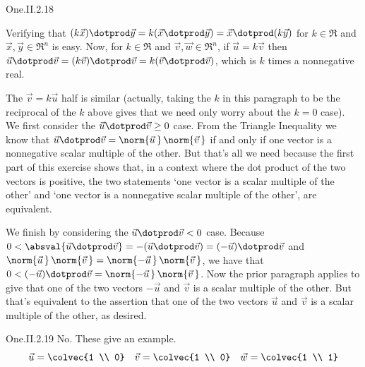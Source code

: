 \begin{ans}{One.II.2.18}
       \begin{exparts}
         \partsitem Verifying that
           \( (k\vec{x})\dotprod\vec{y}=k(\vec{x}\dotprod\vec{y})
           =\vec{x}\dotprod(k\vec{y}) \) for \( k\in\Re \) and
           \( \vec{x},\vec{y}\in\Re^n \) is easy.
           Now, for \( k\in\Re \) and \( \vec{v},\vec{w}\in\Re^n \),
           if \( \vec{u}=k\vec{v} \) then
           \( \vec{u}\dotprod\vec{v}=(k\vec{v})\dotprod\vec{v}
             =k(\vec{v}\dotprod\vec{v}) \),
           which is \( k \) times a nonnegative
           real.

           The \( \vec{v}=k\vec{u} \) half is similar (actually, taking the
           \( k \) in this paragraph to be the reciprocal of the \( k \)
           above gives that we need only worry about the \( k=0 \) case).
         \partsitem We first consider the $\vec{u}\dotprod\vec{v}\geq 0$ case.
           From the Triangle Inequality we know that
           \( \vec{u}\dotprod\vec{v}=\norm{\vec{u}\,}\,\norm{\vec{v}\,} \)
           if and only if one vector is a nonnegative scalar multiple of the
           other.
           But that's all we need because the
           first part of this exercise shows that,
           in a context where the dot product of the two vectors is positive,
           the two statements
           `one vector is a
           scalar multiple of the other' and `one vector is a nonnegative
           scalar multiple of the other', are equivalent.

           We finish by considering the $\vec{u}\dotprod\vec{v}< 0$ case.
           Because
           $0<\absval{\vec{u}\dotprod\vec{v}}=-(\vec{u}\dotprod\vec{v})
            =(-\vec{u})\dotprod\vec{v}$ and
           $\norm{\vec{u}\,}\,\norm{\vec{v}\,}
              =\norm{-\vec{u}\,}\,\norm{\vec{v}\,}$,
           we have that
           $0<(-\vec{u})\dotprod\vec{v}=\norm{-\vec{u}\,}\,\norm{\vec{v}\,}$.
           Now the prior paragraph applies to give that one of the two vectors
           $-\vec{u}$ and $\vec{v}$ is a scalar multiple of the other.
           But that's equivalent to the assertion that one of the two vectors
           $\vec{u}$ and $\vec{v}$ is a scalar multiple of the other,
           as desired.
      \end{exparts}
    
\end{ans}
\begin{ans}{One.II.2.19}
      No.
      These give an example.
      \begin{equation*}
        \vec{u}=\colvec{1 \\ 0}
        \quad
        \vec{v}=\colvec{1 \\ 0}
        \quad
        \vec{w}=\colvec{1 \\ 1}
      \end{equation*}
    
\end{ans}
